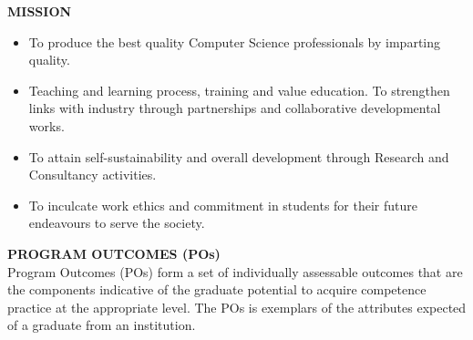\documentclass[12pt,a4paper]{report}
\begin{document}
\vspace{0.5cm}
\noindent
\textbf{MISSION}
\begin{itemize}[leftmargin=*]
    \setlength\itemsep{0.1em}
    \item To produce the best quality Computer Science professionals by imparting quality.
    \item Teaching and learning process, training and value education. To strengthen links with industry through partnerships and collaborative developmental works.
    \item To attain self-sustainability and overall development through Research and Consultancy activities.
    \item To inculcate work ethics and commitment in students for their future endeavours to serve the society.
\end{itemize}

\newpage
\textbf{PROGRAM OUTCOMES (POs)}\\
Program Outcomes (POs) form a set of individually assessable outcomes that are the components indicative of the graduate potential to acquire competence practice at the appropriate level. The POs is exemplars of the attributes expected of a graduate from an institution.
\end{document}
